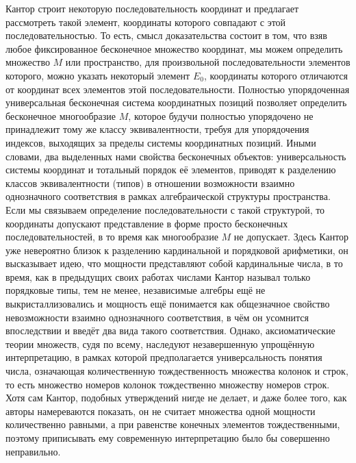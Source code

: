 \documentclass[12pt]{article}
\begin{document}
Кантор строит некоторую последовательность координат и предлагает рассмотреть такой элемент, координаты которого совпадают с этой последовательностью. То есть, смысл доказательства состоит в том, что взяв любое фиксированное бесконечное множество координат, мы можем определить множество $M$ или пространство, для произвольной последовательности элементов которого, можно указать некоторый элемент $E_{0}$, координаты которого отличаются от координат всех элементов этой последовательности. Полностью упорядоченная универсальная бесконечная система координатных позиций позволяет определить бесконечное многообразие $M$, которое будучи полностью упорядочено не принадлежит тому же классу эквивалентности, требуя для упорядочения индексов, выходящих за пределы системы координатных позиций. Иными словами, два выделенных нами свойства бесконечных объектов: универсальность системы координат и тотальный порядок её элементов, приводят к разделению классов эквивалентности (типов) в отношении возможности взаимно однозначного соответствия в рамках алгебраической структуры пространства. Если мы связываем определение последовательности с такой структурой, то координаты допускают представление в форме просто бесконечных последовательностей, в то время как многообразие $M$ не допускает. Здесь Кантор уже невероятно близок к разделению кардинальной и порядковой арифметики, он высказывает идею, что мощности представляют собой кардинальные числа, в то время, как в предыдущих своих работах числами Кантор называл только порядковые типы, тем не менее, независимые алгебры ещё не выкристаллизовались и мощность ещё понимается как общезначное свойство невозможности взаимно однозначного соответствия, в чём он усомнится впоследствии и введёт два вида такого соответствия. Однако, аксиоматические теории множеств, судя по всему, наследуют незавершенную упрощённую интерпретацию, в рамках которой предполагается универсальность понятия числа, означающая количественную тождественность множества колонок и строк, то есть множество номеров колонок тождественно множеству номеров строк. Хотя сам Кантор, подобных утверждений нигде не делает, и даже более того, как авторы намереваются показать, он не считает множества одной мощности количественно равными, а при равенстве конечных элементов тождественными, поэтому приписывать ему современную интерпретацию было бы совершенно неправильно. 
\end{document}
